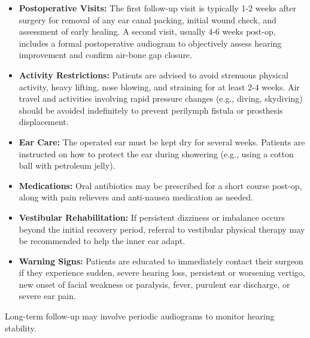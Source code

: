 \begin{itemize}
  \item \textbf{Postoperative Visits:} The first follow-up visit is typically 1-2 weeks after surgery for removal of any ear canal packing, initial wound check, and assessment of early healing. A second visit, usually 4-6 weeks post-op, includes a formal postoperative audiogram to objectively assess hearing improvement and confirm air-bone gap closure.
  
  \item \textbf{Activity Restrictions:} Patients are advised to avoid strenuous physical activity, heavy lifting, nose blowing, and straining for at least 2-4 weeks. Air travel and activities involving rapid pressure changes (e.g., diving, skydiving) should be avoided indefinitely to prevent perilymph fistula or prosthesis displacement.
  
  \item \textbf{Ear Care:} The operated ear must be kept dry for several weeks. Patients are instructed on how to protect the ear during showering (e.g., using a cotton ball with petroleum jelly).
  
  \item \textbf{Medications:} Oral antibiotics may be prescribed for a short course post-op, along with pain relievers and anti-nausea medication as needed.
  
  \item \textbf{Vestibular Rehabilitation:} If persistent dizziness or imbalance occurs beyond the initial recovery period, referral to vestibular physical therapy may be recommended to help the inner ear adapt.
  
  \item \textbf{Warning Signs:} Patients are educated to immediately contact their surgeon if they experience sudden, severe hearing loss, persistent or worsening vertigo, new onset of facial weakness or paralysis, fever, purulent ear discharge, or severe ear pain.
\end{itemize}

Long-term follow-up may involve periodic audiograms to monitor hearing stability.

